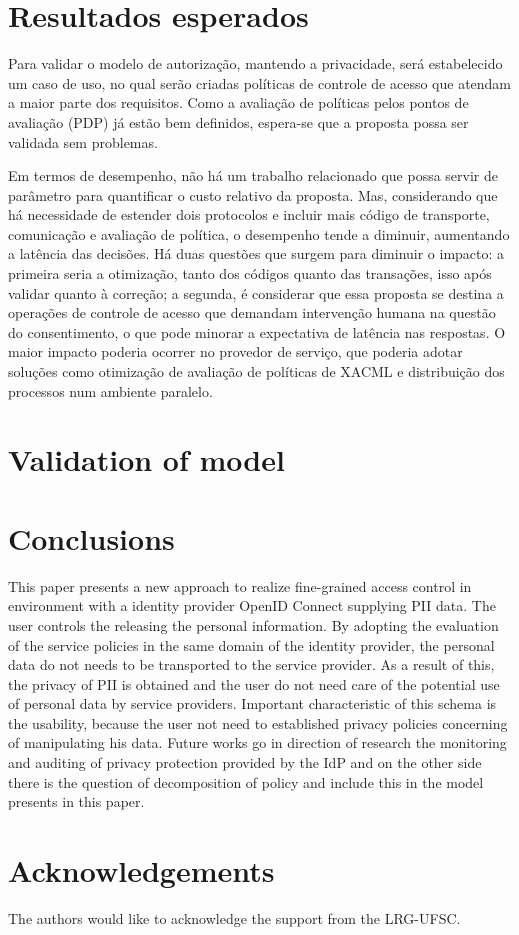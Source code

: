 \documentclass{doublecol-new}
\begin{document}
\section{Resultados esperados}\label{sec:result_esperados}

Para validar o modelo de autorização, mantendo a privacidade, será estabelecido um caso de uso, no qual serão criadas políticas de controle de acesso que atendam a maior parte dos requisitos. Como a avaliação de políticas pelos pontos de avaliação (PDP) já estão bem definidos, espera-se que a proposta possa ser validada sem problemas.

Em termos de desempenho, não há um trabalho relacionado que possa servir de parâmetro para quantificar o custo relativo da proposta. Mas, considerando que há necessidade de estender dois protocolos e incluir mais código de transporte, comunicação e avaliação de política, o desempenho tende a diminuir, aumentando a latência das decisões. Há duas questões que surgem para diminuir o impacto: a primeira seria a otimização, tanto dos códigos quanto das transações, isso após validar quanto à correção; a segunda, é considerar que essa proposta se destina a operações de controle de acesso que demandam intervenção humana na questão do consentimento, o que pode minorar a expectativa de latência nas respostas. O maior impacto poderia ocorrer no provedor de serviço, que poderia adotar soluções como otimização de avaliação de políticas de XACML \cite{mourad2014towards} e distribuição dos processos num ambiente paralelo.



\section{Validation of model}



\section{Conclusions}


This paper presents a new approach to realize fine-grained access control in environment with a identity provider OpenID Connect supplying PII data. The user controls the releasing the personal information. By adopting the evaluation of the service policies in the same domain of the identity provider, the personal data do not needs to be transported to the service provider. As a result of this, the privacy of PII is obtained and the user do not need care of the potential use of personal data by service providers. Important characteristic of this schema is the usability, because the user not need to established privacy policies concerning of manipulating his data.
Future works go in direction of research the monitoring and auditing of privacy protection provided by the IdP and on the other side there is the question of decomposition of policy and include this in the model presents in this paper.


\section*{Acknowledgements}
The authors would like to acknowledge the support from the LRG-UFSC.



\end{document}
